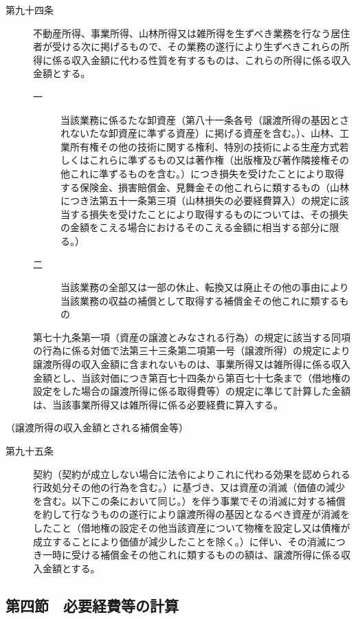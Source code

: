 \documentclass[twocolumn,a4j,10pt]{ltjtarticle}
\begin{document}
\begin{description}
\item[第九十四条]不動産所得、事業所得、山林所得又は雑所得を生ずべき業務を行なう居住者が受ける次に掲げるもので、その業務の遂行により生ずべきこれらの所得に係る収入金額に代わる性質を有するものは、これらの所得に係る収入金額とする。
\begin{description}
\item[一]当該業務に係るたな卸資産（第八十一条各号（譲渡所得の基因とされないたな卸資産に準ずる資産）に掲げる資産を含む。）、山林、工業所有権その他の技術に関する権利、特別の技術による生産方式若しくはこれらに準ずるもの又は著作権（出版権及び著作隣接権その他これに準ずるものを含む。）につき損失を受けたことにより取得する保険金、損害賠償金、見舞金その他これらに類するもの（山林につき法第五十一条第三項（山林損失の必要経費算入）の規定に該当する損失を受けたことにより取得するものについては、その損失の金額をこえる場合におけるそのこえる金額に相当する部分に限る。）
\item[二]当該業務の全部又は一部の休止、転換又は廃止その他の事由により当該業務の収益の補償として取得する補償金その他これに類するもの
\end{description}
\item[]第七十九条第一項（資産の譲渡とみなされる行為）の規定に該当する同項の行為に係る対価で法第三十三条第二項第一号（譲渡所得）の規定により譲渡所得の収入金額に含まれないものは、事業所得又は雑所得に係る収入金額とし、当該対価につき第百七十四条から第百七十七条まで（借地権の設定をした場合の譲渡所得に係る取得費等）の規定に準じて計算した金額は、当該事業所得又は雑所得に係る必要経費に算入する。
\end{description}
\noindent\hspace{10pt}（譲渡所得の収入金額とされる補償金等）
\begin{description}
\item[第九十五条]契約（契約が成立しない場合に法令によりこれに代わる効果を認められる行政処分その他の行為を含む。）に基づき、又は資産の消滅（価値の減少を含む。以下この条において同じ。）を伴う事業でその消滅に対する補償を約して行なうものの遂行により譲渡所得の基因となるべき資産が消滅をしたこと（借地権の設定その他当該資産について物権を設定し又は債権が成立することにより価値が減少したことを除く。）に伴い、その消滅につき一時に受ける補償金その他これに類するものの額は、譲渡所得に係る収入金額とする。
\end{description}
\subsection*{第四節　必要経費等の計算}
\end{document}
